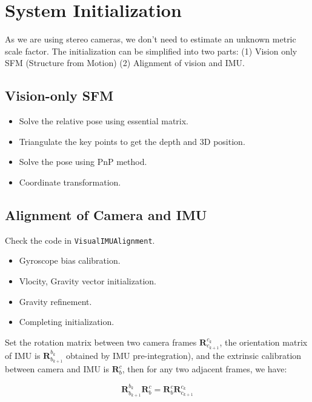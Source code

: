 \documentclass[12pt]{report}   %
\begin{document}
\chapter{System Initialization}


As we are using stereo cameras, we don't need to estimate an unknown metric scale factor. The initialization can be simplified into two parts: (1) Vision only SFM (Structure from Motion) (2) Alignment of vision and IMU.

\section{Vision-only SFM}

\begin{itemize}
	\item Solve the relative pose using essential matrix.
	\item Triangulate the key points to get the depth and 3D position.
	\item Solve the pose using PnP method.
	\item Coordinate transformation.
	
\end{itemize}


\section{Alignment of Camera and IMU}

Check the code in \verb|VisualIMUAlignment|.

\begin{itemize}
	\item Gyroscope bias calibration.
	\item Vlocity, Gravity vector initialization.
	\item Gravity refinement.
	\item Completing initialization.
	
\end{itemize}

Set the rotation matrix between two camera frames $\bm{R}^{c_k}_{c_{k+1}}$, the orientation matrix of IMU is $\bm{R}^{b_k}_{b_{k+1}}$ obtained by IMU pre-integration), and the extrinsic calibration between camera and IMU is $\bm{R}_b^c$, then for any two adjacent frames, we have:

\begin{equation}
	\bm{R}^{b_k}_{b_{k+1}}\bm{R}_b^c = \bm{R}_b^c\bm{R}^{c_k}_{c_{k+1}}
\end{equation}
\end{document}
